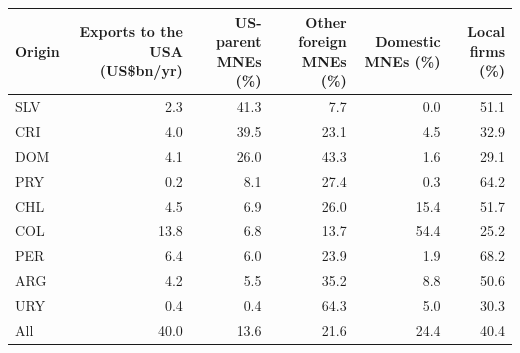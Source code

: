 \begin{tabular}{lrrrrr}
\toprule
Origin & Exports to the USA (US\$bn/yr) & US-parent MNEs (\%) & Other foreign MNEs (\%) & Domestic MNEs (\%) & Local firms (\%) \\
\midrule
SLV & 2.3 & 41.3 & 7.7 & 0.0 & 51.1 \\
CRI & 4.0 & 39.5 & 23.1 & 4.5 & 32.9 \\
DOM & 4.1 & 26.0 & 43.3 & 1.6 & 29.1 \\
PRY & 0.2 & 8.1 & 27.4 & 0.3 & 64.2 \\
CHL & 4.5 & 6.9 & 26.0 & 15.4 & 51.7 \\
COL & 13.8 & 6.8 & 13.7 & 54.4 & 25.2 \\
PER & 6.4 & 6.0 & 23.9 & 1.9 & 68.2 \\
ARG & 4.2 & 5.5 & 35.2 & 8.8 & 50.6 \\
URY & 0.4 & 0.4 & 64.3 & 5.0 & 30.3 \\
\midrule
All & 40.0 & 13.6 & 21.6 & 24.4 & 40.4 \\
\bottomrule
\end{tabular}
